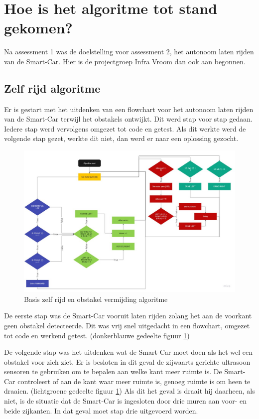 \section{Hoe is het algoritme tot stand gekomen?}
Na assessment 1 was de doelstelling voor assessment 2, het autonoom laten rijden van de \gls{Smart-Car}. Hier is de projectgroep Infra Vroom dan ook aan begonnen. 
\subsection{Zelf rijd algoritme}
Er is gestart met het uitdenken van een flowchart voor het autonoom laten rijden van de \gls{Smart-Car} terwijl het obstakels ontwijkt. Dit werd stap voor stap gedaan. Iedere stap werd vervolgens omgezet tot code en getest. Als dit werkte werd de volgende stap gezet, werkte dit niet, dan werd er naar een oplossing gezocht. 

\begin{figure}[h]
    \centering
    \includegraphics[scale = 0.59]{Media/Figuren/zelf rijd algoritme.jpg}
    \caption{Basis zelf rijd en obstakel vermijding algoritme}
    \label{Zelf rijd algoritme}
\end{figure}

De eerste stap was de \gls{Smart-Car} vooruit laten rijden zolang het aan de voorkant geen obstakel detecteerde. Dit was vrij snel uitgedacht in een flowchart, omgezet tot code en werkend getest. (donkerblauwe gedeelte figuur \ref{Zelf rijd algoritme})

De volgende stap was het uitdenken wat de \gls{Smart-Car} moet doen als het wel een obstakel voor zich ziet. Er is besloten in dit geval de zijwaarts gerichte ultrasoon sensoren te gebruiken om te bepalen aan welke kant meer ruimte is. De \gls{Smart-Car} controleert of aan de kant waar meer ruimte is, genoeg ruimte is om heen te draaien. (lichtgroene gedeelte figuur \ref{Zelf rijd algoritme}) Als dit het geval is draait hij daarheen, als niet, is de situatie dat de \gls{Smart-Car} is ingesloten door drie muren aan voor- en beide zijkanten. In dat geval moet stap drie uitgevoerd worden. 

